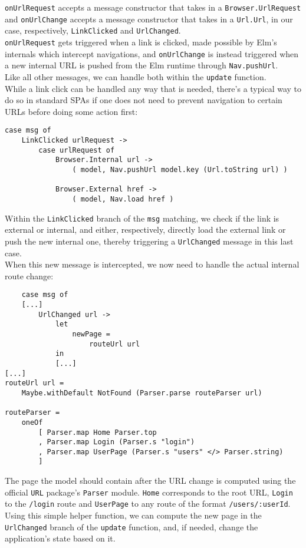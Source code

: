 \texttt{onUrlRequest} accepts a message constructor that takes in a \texttt{Browser.UrlRequest} and \texttt{onUrlChange} accepts a message constructor that takes in a \texttt{Url.Url}, in our case, respectively, \texttt{LinkClicked} and \texttt{UrlChanged}.\\
\texttt{onUrlRequest} gets triggered when a link is clicked, made possible by Elm's internals which intercept navigations, and \texttt{onUrlChange} is instead triggered when a new internal URL is pushed from the Elm runtime through \texttt{Nav.pushUrl}.\\
Like all other messages, we can handle both within the \texttt{update} function.\\

While a link click can be handled any way that is needed, there's a typical way to do so in standard SPAs if one does not need to prevent navigation to certain URLs before doing some action first\cite{noauthor_navigation_nodate}:
\begin{verbatim}
case msg of
    LinkClicked urlRequest ->
        case urlRequest of
            Browser.Internal url ->
                ( model, Nav.pushUrl model.key (Url.toString url) )

            Browser.External href ->
                ( model, Nav.load href )
\end{verbatim}

Within the \texttt{LinkClicked} branch of the \texttt{msg} matching, we check if the link is external or internal, and either, respectively, directly load the external link or push the new internal one, thereby triggering a \texttt{UrlChanged} message in this last case.\\

When this new message is intercepted, we now need to handle the actual internal route change:
\begin{verbatim}
    case msg of
    [...]
        UrlChanged url ->
            let
                newPage =
                    routeUrl url
            in
            [...]
[...]
routeUrl url =
    Maybe.withDefault NotFound (Parser.parse routeParser url)
    
routeParser =
    oneOf
        [ Parser.map Home Parser.top
        , Parser.map Login (Parser.s "login")
        , Parser.map UserPage (Parser.s "users" </> Parser.string)
        ]
\end{verbatim}
The page the model should contain after the URL change is computed using  the official \texttt{URL} package's \texttt{Parser} module. \texttt{Home} corresponds to the root URL, \texttt{Login} to the \texttt{/login} route and \texttt{UserPage} to any route of the format \texttt{/users/:userId}.\\
Using this simple helper function, we can compute the new page in the \texttt{UrlChanged} branch of the \texttt{update} function, and, if needed, change the application's state based on it.

